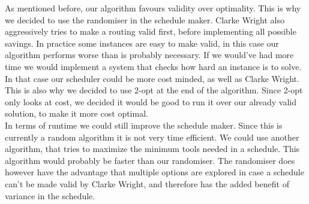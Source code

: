 \documentclass[a4paper]{article}
\begin{document}
As mentioned before, our algorithm favours validity over optimality. This is why we decided to use the randomiser in the schedule maker. Clarke Wright also aggressively tries to make a routing valid first, before implementing all possible savings. In practice some instances are easy to make valid, in this case our algorithm performs worse than is probably necessary. If we would’ve had more time we would implement a system that checks how hard an instance is to solve. In that case our scheduler could be more cost minded, as well as Clarke Wright. This is also why we decided to use 2-opt at the end of the algorithm. Since 2-opt only looks at cost, we decided it would be good to run it over our already valid solution, to make it more cost optimal. \\

In terms of runtime we could still improve the schedule maker. Since this is currently a random algorithm it is not very time efficient. We could use another algorithm, that tries to maximize the minimum tools needed in a schedule. This algorithm would probably be faster than our randomiser. The randomiser does however have the advantage that multiple options are explored in case a schedule can’t be made valid by Clarke Wright, and therefore has the added benefit of variance in the schedule.




\end{document}
